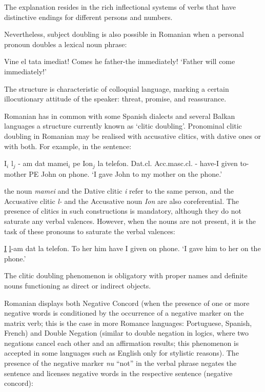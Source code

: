 \begin{multicols}{2}
The explanation resides in the rich inflectional systems of verbs that have distinctive endings for different persons and numbers.

Nevertheless, subject doubling is also possible in Romanian when a personal pronoun doubles a lexical noun phrase:

\begin{example}
\gll Vine el tata imediat!
Comes he father-the immediately!
\glt `Father will come immediately!'
\glend
\end{example}

The structure is characteristic of colloquial language, marking a certain illocutionary attitude of the speaker: threat, promise, and reassurance.

Romanian has in common with some Spanish dialects and several Balkan languages a structure currently known as ‘clitic doubling’. Pronominal clitic doubling in Romanian may be realised with accusative clitics, with dative ones or with both. For example, in the sentence:

\begin{example}
\gll I$_{i}$ l$_{j}$ - am dat mamei$_{i}$ pe Ion$_{j}$ la telefon.
Dat.cl. Acc.masc.cl. - {have-I} given {to-mother} PE John on phone.
\glt `I gave John to my mother on the phone.'
\glend
\end{example}

the noun \textit{mamei} and the Dative clitic \textit{i} refer to the same person, and the Accusative clitic \textit{l-} and the Accusative noun \textit{Ion} are also coreferential. The presence of clitics in such constructions is mandatory, although they do not saturate any verbal valences. However, when the nouns are not present, it is the task of these pronouns to saturate the verbal valences:

\begin{example}
\gll \underline{I} \underline{l}-am dat la telefon.
{To her} {him have I} given on phone.
\glt `I gave him to her on the phone.'
\glend
\end{example}

The clitic doubling phenomenon is obligatory with proper names and definite nouns functioning as direct or indirect objects.

Romanian displays both Negative Concord (when the presence of one or more negative words is conditioned by the occurrence of a negative marker on the matrix verb; this is the case in more Romance languages: Portuguese, Spanish, French) and Double Negation (similar to double negation in logics, where two negations cancel each other and an affirmation results; this phenomenon is accepted in some languages such as English only for stylistic reasons). The presence of the negative marker \textit{nu} ``not'' in the verbal phrase negates the sentence and licenses negative words in the respective sentence (negative concord):


\end{multicols}
